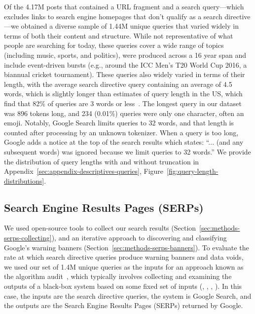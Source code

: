 Of the 4.17M posts that contained a URL fragment and a search query---which excludes links to search engine homepages that don't qualify as a search directive---we obtained a diverse sample of 1.44M unique queries that varied widely in terms of both their content and structure. While not representative of what people are searching for today, these queries cover a wide range of topics (including music, sports, and politics), were produced across a 16 year span and include event-driven bursts (e.g., around the ICC Men’s T20 World Cup 2016, a biannual cricket tournament). 
These queries also widely varied in terms of their length, with the average search directive query containing an average of 4.5 words, which is slightly longer than estimates of query length in the US, which find that 82\% of queries are 3 words or less~\citep{keyworddiscovery2020keyword}. 
The longest query in our dataset was 896 tokens long, and 234 (0.01\%) queries were only one character, often an emoji.
Notably, Google Search limits queries to 32 words, and that length is counted after processing by an unknown tokenizer. When a query is too long, Google adds a notice at the top of the search results which states: ``... (and any subsequent words) was ignored because we limit queries to 32 words.''
We provide the distribution of query lengths with and without truncation in Appendix~\ref{sec:appendix-descriptives-queries}, Figure~\ref{fig:query-length-distributions}.

\subsection{Search Engine Results Pages (SERPs)}
\label{sec:methods-serps}

We used open-source tools to collect our search results (Section~\ref{sec:methods-serps-collecting}), and an iterative approach to discovering and classifying Google's warning banners (Section~\ref{sec:methods-serps-banners}).
To evaluate the rate at which search directive queries produce warning banners and data voids, we used our set of 1.4M unique queries as the inputs for an approach known as the algorithm audit~\citep{sandvig2014auditing}, which typically involves collecting and examining the outputs of a black-box system based on some fixed set of inputs (\cite{bandy2021problematic}, \cite{metaxa2021auditing}, \cite{mustafaraj2020case}, \cite{vanhoof2022searching}).
In this case, the inputs are the search directive queries, the system is Google Search, and the outputs are the Search Engine Results Pages (SERPs) returned by Google. 

